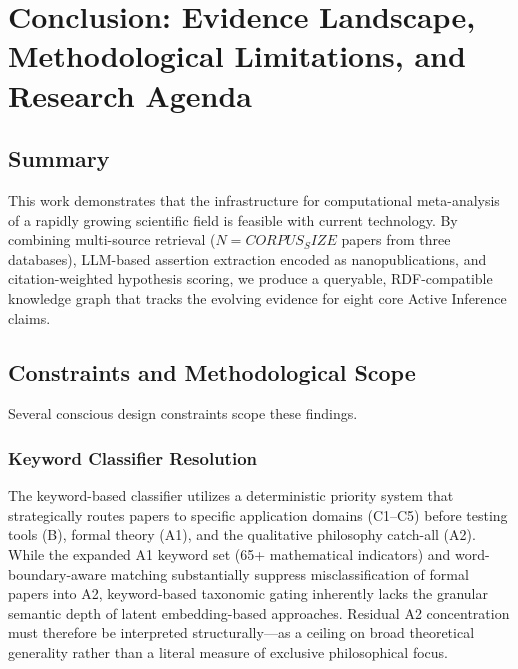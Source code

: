 \documentclass[
]{article}
\begin{document}
\newpage

\section{\texorpdfstring{Conclusion: Evidence Landscape, Methodological
Limitations, and Research Agenda
\label{sec:conclusion}}{Conclusion: Evidence Landscape, Methodological Limitations, and Research Agenda }}\label{conclusion-evidence-landscape-methodological-limitations-and-research-agenda}

\subsection{Summary}\label{summary}

This work demonstrates that the infrastructure for computational
meta-analysis of a rapidly growing scientific field is feasible with
current technology. By combining multi-source retrieval
(\(N = {{CORPUS_SIZE}}\) papers from three databases), LLM-based
assertion extraction encoded as nanopublications, and citation-weighted
hypothesis scoring, we produce a queryable, RDF-compatible knowledge
graph that tracks the evolving evidence for eight core Active Inference
claims.

\subsection{Constraints and Methodological
Scope}\label{constraints-and-methodological-scope}

Several conscious design constraints scope these findings.

\subsubsection{Keyword Classifier
Resolution}\label{keyword-classifier-resolution}

The keyword-based classifier utilizes a deterministic priority system
that strategically routes papers to specific application domains
(C1--C5) before testing tools (B), formal theory (A1), and the
qualitative philosophy catch-all (A2). While the expanded A1 keyword set
(65+ mathematical indicators) and word-boundary-aware matching
substantially suppress misclassification of formal papers into A2,
keyword-based taxonomic gating inherently lacks the granular semantic
depth of latent embedding-based approaches. Residual A2 concentration
must therefore be interpreted structurally---as a ceiling on broad
theoretical generality rather than a literal measure of exclusive
philosophical focus.
\end{document}
